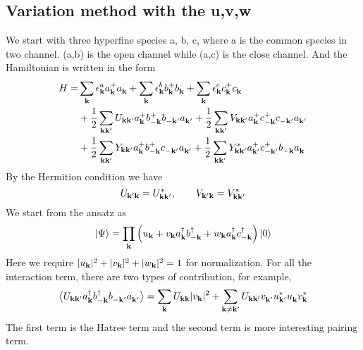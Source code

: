 \subsection{Variation method with the u,v,w\label{sec:variation}}
We start with three hyperfine species a, b, c, where a is the common species in two channel. (a,b) is the open channel while (a,c) is the close channel. And the Hamiltonian is written in the form 
\begin{equation}
\begin{split}
 H=&\sum_\vk\epsilon^a_\vk{}a^+_\vk{}a^{}_\vk+\sum_\vk\epsilon^b_\vk{}b^+_\vk{}b^{}_\vk+\sum_\vk\epsilon^c_\vk{}c^+_\vk{}c^{}_\vk\\
  &+\nth{2}\sum_{\vk\vk'}U_{\vk\vk'}a^+_\vk{}b^+_{-\vk}{}b^{}_{-\vk'}a^{}_{\vk'}
	+\nth{2}\sum_{\vk\vk'}V_{\vk\vk'}a^+_\vk{}c^+_{-\vk}{}c^{}_{-\vk'}a^{}_{\vk'}\\
 &+\nth{2}\sum_{\vk\vk'}Y_{\vk\vk'}a^+_\vk{}b^+_{-\vk}{}c^{}_{-\vk'}a^{}_{\vk'}
	+\nth{2}\sum_{\vk\vk'}Y^*_{\vk\vk'}a^+_{\vk'}{}c^+_{-\vk'}{}b^{}_{-\vk}a^{}_{\vk}
\end{split} 
\end{equation}
By the Hermition condition we have 
\begin{equation}
 U_{\vk'\vk}=U^*_{\vk\vk'},\qquad{} V_{\vk'\vk}=V^*_{\vk\vk'}
\end{equation}
  We start from the ansatz as 
\begin{equation}\label{eq:ansatz}
 \ket{\Psi}=\prod_\vk\br{u_\vk+v_\vk{}a^\dg_\vk{}b^\dg_{-\vk}+w_\vk{}a^\dg_\vk{}c^\dg_{-\vk}}\ket{0}
\end{equation}
Here we require $\abs{u_\vk}^2+\abs{v_\vk}^2+\abs{w_\vk}^2=1$ for normalization.  For all the interaction term, there are two types of contribution,
for example, 
\begin{equation*}
\av{U_{\vk\vk'}a^\dg_\vk{}b^\dg_{-\vk}{}b^{}_{-\vk'}a^{}_{\vk'}}
=\sum_{\vk}U_{\vk\vk}\abs{v_\vk}^2+\sum_{\vk\neq\vk'}U_{\vk\vk'}v^{}_{\vk'}u^*_{\vk'}u^{}_\vk{}v^*_\vk
\end{equation*}
The first term is the Hatree term and the second term is more interesting pairing term.



